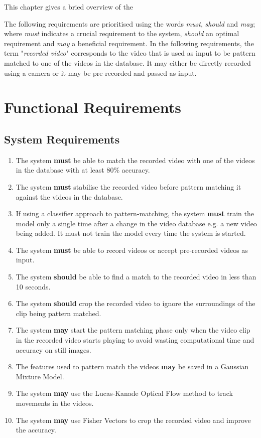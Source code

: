 This chapter gives a bried overview of the 

The following requirements are prioritised using the words \textit{must}, \textit{should} and \textit{may}; where \textit{must} indicates a crucial requirement to the system, \textit{should} an optimal requirement and \textit{may} a beneficial requirement. In the following requirements, the term "\textit{recorded video}" corresponds to the video that is used as input to be pattern matched to one of the videos in the database. It may either be directly recorded using a camera or it may be pre-recorded and passed as input.

\section{Functional Requirements}

\subsection{System Requirements}

\begin{enumerate}
    \item The system \textbf{must} be able to match the recorded video with one of the videos in the database with at least 80\% accuracy.
    \item The system \textbf{must} stabilise the recorded video before pattern matching it against the videos in the database.
    \item If using a classifier approach to pattern-matching, the system \textbf{must} train the model only a single time after a change in the video database e.g. a new video being added. It must not train the model every time the system is started.
    \item The system \textbf{must} be able to record videos or accept pre-recorded videos as input.
    \item The system \textbf{should} be able to find a match to the recorded video in less than 10 seconds.
    \item The system \textbf{should} crop the recorded video to ignore the surroundings of the clip being pattern matched.
    \item The system \textbf{may} start the pattern matching phase only when the video clip in the recorded video starts playing to avoid wasting computational time and accuracy on still images.
    \item The features used to pattern match the videos \textbf{may} be saved in a Gaussian Mixture Model.
    \item The system \textbf{may} use the Lucas-Kanade Optical Flow method to track movements in the videos.
    \item The system \textbf{may} use Fisher Vectors to crop the recorded video and improve the accuracy.
\end{enumerate}

